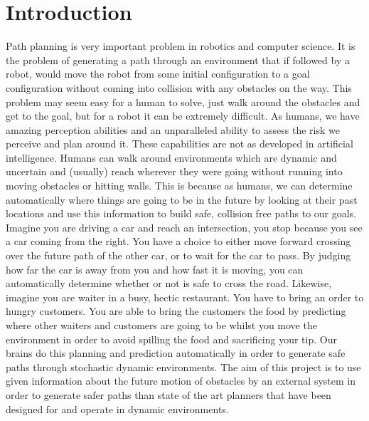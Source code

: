 


\chapter{Introduction}

\label{chapter:introduction}

Path planning is very important problem in robotics and computer science. It is
the problem of generating a path through an environment that if followed by a
robot, would move the robot from some initial configuration to a goal
configuration without coming into collision with any obstacles on the way. This
problem may seem easy for a human to solve, just walk around the obstacles and
get to the goal, but for a robot it can be extremely difficult. As humans, we
have amazing perception abilities and an unparalleled ability to assess the
risk we perceive and plan around it. These capabilities are not as developed in
artificial intelligence. Humans can walk around environments which are dynamic
and uncertain and (usually) reach wherever they were going without running into
moving obstacles or hitting walls. This is because as humans, we can determine
automatically where things are going to be in the future by looking at their
past locations and use this information to build safe, collision free paths to
our goals. Imagine you are driving a car and reach an intersection, you stop
because you see a car coming from the right. You have a choice to either move
forward crossing over the future path of the other car, or to wait for the car
to pass. By judging how far the car is away from you and how fast it is moving,
you can automatically determine whether or not is safe to cross the road.
Likewise, imagine you are waiter in a busy, hectic restaurant. You have to
bring an order to hungry customers. You are able to bring the customers the
food by predicting where other waiters and customers are going to be whilst you
move the environment in order to avoid spilling the food and sacrificing your
tip. Our brains do this planning and prediction automatically in order to
generate safe paths through stochastic dynamic environments. The aim of this
project is to use given information about the future motion of obstacles by an
external system in order to generate safer paths than state of the art planners
that have been designed for and operate in dynamic environments.

